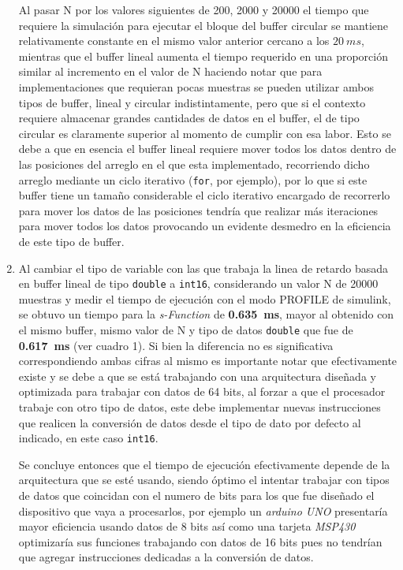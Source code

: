 \begin{enumerate}
Al pasar N por los valores siguientes de 200, 2000 y 20000 el tiempo que requiere la simulación para ejecutar el bloque del buffer circular se mantiene relativamente constante   en el mismo valor anterior cercano a los  $20~ms$, mientras que el buffer lineal aumenta el tiempo requerido en una proporción similar al incremento en el valor de N haciendo notar que para implementaciones que requieran pocas muestras se pueden utilizar ambos tipos de buffer, lineal y circular indistintamente, pero que si el contexto requiere almacenar grandes cantidades de datos en el buffer, el de tipo circular es claramente superior al momento de cumplir con esa labor. Esto se debe a que en esencia el buffer lineal requiere mover todos los datos dentro de las posiciones del arreglo en el que esta implementado, recorriendo dicho arreglo mediante un ciclo iterativo  (\texttt {for}, por ejemplo), por lo que si este buffer tiene un tamaño considerable el ciclo iterativo encargado de recorrerlo para mover los datos de las posiciones tendría que realizar más iteraciones para mover todos los datos provocando un evidente desmedro en la eficiencia de este tipo de buffer. 


\item Al cambiar el tipo de variable con las que trabaja la linea de retardo basada en buffer lineal de tipo \texttt{double} a \texttt{int16}, considerando un valor N de 20000 muestras y medir el tiempo de ejecución con el modo PROFILE de simulink, se obtuvo un tiempo para la \textit{s-Function} de \textbf{0.635~ms}, mayor al obtenido con el mismo buffer, mismo valor de N   y tipo de datos \texttt{double} que fue de \textbf{0.617~ms} (ver cuadro 1). Si bien la diferencia no es significativa  correspondiendo ambas cifras al mismo es importante notar que efectivamente existe y se debe a que se está trabajando con una arquitectura diseñada y optimizada para trabajar con datos de 64 bits,  al forzar a que el procesador trabaje con otro tipo de datos, este debe implementar nuevas instrucciones que realicen la conversión de datos desde el tipo de dato por defecto al indicado, en este caso \texttt{int16}.

Se concluye entonces que el tiempo de ejecución efectivamente depende de la arquitectura que se esté usando, siendo óptimo el intentar trabajar con tipos de datos que coincidan con el numero de bits para los que fue diseñado el dispositivo que vaya a procesarlos, por ejemplo un \textit{arduino UNO} presentaría mayor eficiencia usando datos de 8 bits  así como una tarjeta  \textit{MSP430} optimizaría sus funciones trabajando con datos de 16 bits pues no tendrían que agregar instrucciones dedicadas a la conversión de datos.



\end{enumerate}
